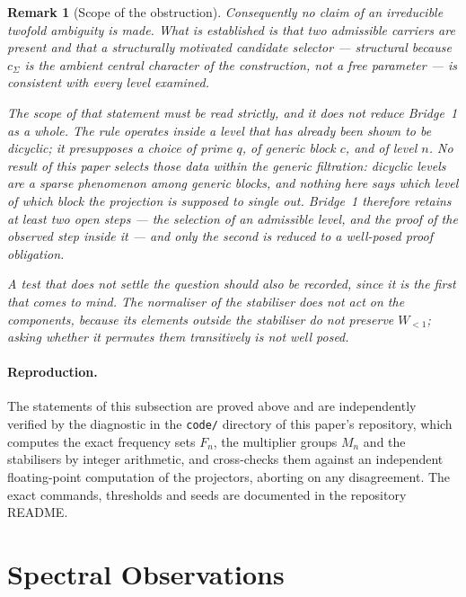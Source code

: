 \documentclass[11pt,a4paper]{article}
\newtheorem{remark}[theorem]{Remark}
\begin{document}
\begin{remark}[Scope of the obstruction]
      Consequently no claim of an irreducible twofold ambiguity is made.
      What is established is that two admissible carriers are present and that a structurally
      motivated candidate selector --- structural because $c_{\Sigma}$ is the ambient central
      character of the construction, not a free parameter --- is consistent with every level
      examined.

      The scope of that statement must be read strictly, and it does not reduce Bridge~1 as a
      whole.
      The rule operates \emph{inside} a level that has already been shown to be dicyclic; it
      presupposes a choice of prime $q$, of generic block $c$, and of level $n$.
      No result of this paper selects those data within the generic filtration: dicyclic levels
      are a sparse phenomenon among generic blocks, and nothing here says which level of which
      block the projection is supposed to single out.
      Bridge~1 therefore retains at least two open steps --- the selection of an admissible
      level, and the proof of the observed step inside it --- and only the second is reduced to
      a well-posed proof obligation.

      A test that does \emph{not} settle the question should also be recorded, since it is the
      first that comes to mind.
      The normaliser of the stabiliser does not act on the components, because its elements
      outside the stabiliser do not preserve $W_{<1}$; asking whether it permutes them
      transitively is not well posed.
    \end{remark}

    \paragraph{Reproduction.}
      The statements of this subsection are proved above and are independently verified by the
      diagnostic in the \texttt{code/} directory of this paper's repository, which computes the
      exact frequency sets $F_{n}$, the multiplier groups $M_{n}$ and the stabilisers by integer
      arithmetic, and cross-checks them against an independent floating-point computation of the
      projectors, aborting on any disagreement.
      The exact commands, thresholds and seeds are documented in the repository README.

  \section{Spectral Observations}
  \label{sec:spectral}
\end{document}
